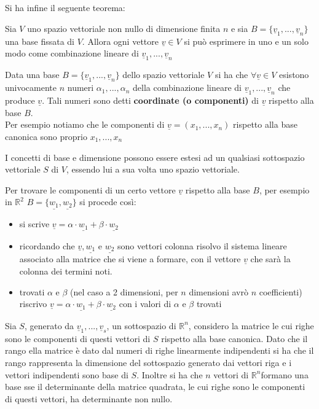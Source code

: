 \documentclass[a4paper,12pt, oneside]{book}
\begin{document}
Si ha infine il seguente teorema:
\begin{teorema}
Sia $V$ uno spazio vettoriale non nullo di dimensione finita $n$ e sia $B=\{\underline{v}_1,...,\underline{v}_n\}$ una base fissata di $V$. Allora ogni vettore $\underline{v}\in V$ si può esprimere in uno e un solo modo come combinazione lineare di $\underline{v}_1,...,\underline{v}_n$
\end{teorema}
\begin{definizione}
Data una base $B=\{\underline{v}_1,...,\underline{v}_n\}$ dello spazio vettoriale $V$ si ha che $\forall \underline{v}\in V$ esistono univocamente $n$ numeri $\alpha_1,...,\alpha_n$ della combinazione lineare di $\underline{v}_1,...,\underline{v}_n$ che produce $\underline{v}$. Tali numeri sono detti \textbf{coordinate (o componenti)} di $\underline{v}$ rispetto alla base $B$.\\
Per esempio notiamo che le componenti di $\underline{v}=(x_1,...,x_n)$ rispetto alla base canonica sono proprio $x_1,...,x_n$
\end{definizione}
\begin{shaded}
I concetti di base e dimensione possono essere estesi ad un qualsiasi sottospazio vettoriale $S$ di $V$, essendo lui a sua volta uno spazio vettoriale.
\end{shaded}
\begin{nota}
Per trovare le componenti di un certo vettore $\underline{v}$ rispetto alla base $B$, per esempio in $\mathbb{R}^2$ $B=\{\underline{w_1},\underline{w_2}\}$ si procede così:
\begin{itemize}
\item si scrive $\underline{v}=\alpha\cdot \underline{w_1}+\beta\cdot \underline{w_2}$
\item ricordando che $\underline{v},\underline{w_1}$ e $\underline{w_2}$ sono vettori colonna risolvo il sistema lineare associato alla matrice che si viene a formare, con il vettore $\underline{v}$ che sarà la colonna dei termini noti. 
\item trovati $\alpha$  e $\beta$ (nel caso a 2 dimensioni, per $n$ dimensioni avrò $n$ coefficienti) riscrivo $\underline{v}=\alpha\cdot \underline{w_1}+\beta\cdot \underline{w_2}$ con i valori di $\alpha$ e $\beta$ trovati
\end{itemize}
\end{nota}
\begin{nota}
Sia $S$, generato da $\underline{v}_1,...,\underline{v}_s$,  un sottospazio di $\mathbb{R}^n$, considero la matrice le cui righe sono le componenti di questi vettori di $S$ rispetto alla base canonica. Dato che il rango ella matrice è dato dal numeri di righe linearmente indipendenti si ha che il rango rappresenta la dimensione del sottospazio generato dai vettori riga e i vettori indipendenti sono base di $S$. Inoltre si ha che $n$ vettori di $\mathbb{R}^n$formano una base sse il determinante della matrice quadrata, le cui righe sono le componenti di questi vettori, ha determinante non nullo.
\end{nota}
\end{document}
